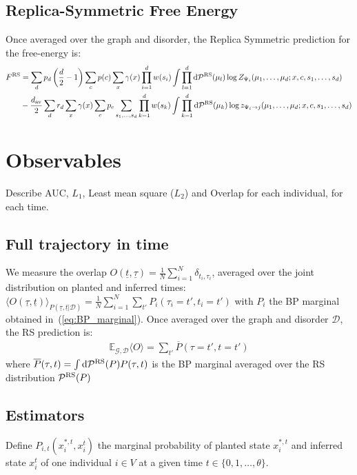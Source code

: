 \documentclass[a4paper, amsfonts, amssymb, amsmath, reprint, showkeys, nofootinbib, twoside, floatfix, pre,superscriptaddress, onecolumn]{revtex4-2}
\begin{document}
\subsection{Replica-Symmetric Free Energy}
Once averaged over the graph and disorder, the Replica Symmetric prediction for the free-energy is:
\begin{align}
\begin{aligned}
F^{\rm RS} &= \sum_d p_d \left(\frac{d}{2}-1\right)\sum_cp(c)\sum_{x}\gamma(x)\prod_{i=1}^dw(s_i)\int\prod_{l=1}^d{\rm d}\mathcal{P}^{\rm RS}(\mu_l)\log Z_{\Psi_i}(\mu_1,\dots,\mu_d;x,c,s_1,\dots,s_d) \\
&-\frac{d_{\rm av}}{2}\sum_dr_d\sum_{x}\gamma(x)\sum_cp_c\sum_{s_1,\dots,s_d}\prod_{k=1}^dw(s_k)\int\prod_{k=1}^d{\rm d}\mathcal{P}^{\rm RS}(\mu_k)\log z_{\Psi_i\to j}(\mu_1,\dots,\mu_d;x,c,s_1,\dots,s_d)
\end{aligned}
\end{align}



\section{Observables}
Describe AUC, $L_1$, Least mean square ($L_2$) and Overlap for each individual, for each time.
\subsection{Full trajectory in time}
We measure the overlap $O(\underline{t},\underline{\tau}) = \frac{1}{N}\sum_{i=1}^N\delta_{t_i,\tau_i}$, averaged over the joint distribution on planted and inferred times:
$
	\langle O(\underline{\tau}, \underline{t})\rangle_{P(\underline{\tau}, \underline{t}|\mathcal{D})} = \frac{1}{N}\sum_{i=1}^N\sum_{t'}P_i(\tau_i=t',t_i=t')
$
with $P_i$ the BP marginal obtained in~(\ref{eq:BP_marginal}).
Once averaged over the graph and disorder $\mathcal{D}$, the RS prediction is:
\begin{align}
	\mathbb{E}_{\mathcal{G},\mathcal{D}}\langle O\rangle =\sum_{t'}\overline{P}(\tau=t',t=t')
\end{align}
where $\overline{P}(\tau, t) = \int {\rm d} \mathcal{P}^{\rm RS}(P)P(\tau, t)$ is the BP marginal averaged over the RS distribution $\mathcal{P}^{\rm RS}(P)$

\subsection{Estimators}
Define $P_{i,t}(x_i^{*,t},x_i^t)$ the marginal probability of planted state $x_i^{*,t}$ and inferred state $x_i^t$ of one individual $i\in V$ at a given time $t\in\{0,1,\dots,\theta\}$.
\end{document}
